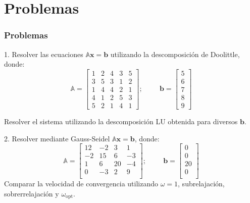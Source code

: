 \documentclass[9pt, aspectratio=169]{beamer}
\begin{document}
\section{Problemas}
\begin{frame}
 \frametitle{Problemas}
1. Resolver las ecuaciones $\mathbb{A} \mathbf{x}= \mathbf{b}$ utilizando la descomposición de Doolittle, donde:
\begin{equation*}
 \mathbb{A} = \left[ 
 \begin{array}{ccccc}
 1 & 2 & 4 & 3 & 5 \\
 3 & 5 & 3 & 1 & 2 \\
 1 & 4 & 4 & 2 & 1 \\
 4 & 1 & 2 & 5 & 3 \\
 5 & 2 & 1 & 4 & 1
  \end{array} \right]; \hspace{1cm}
\mathbf{b} = \left[ 
 \begin{array}{c}
 5 \\
 6 \\
 7 \\
 8 \\
 9
  \end{array} \right]
\end{equation*}

Resolver el sistema utilizando la descomposición LU obtenida para diversos $\mathbf{b}$.
\bigskip

2. Resolver mediante Gauss-Seidel $\mathbb{A} \mathbf{x}= \mathbf{b}$, donde:
\begin{equation*}
 \mathbb{A} = \left[ 
 \begin{array}{rrrr}
 12 & -2 & 3 & 1 \\
 -2 & 15 & 6 & -3 \\
 1 & 6 & 20 & -4 \\
 0 & -3 & 2 & 9 \\
  \end{array} \right]; \hspace{1cm}
\mathbf{b} = \left[ 
 \begin{array}{r}
 0  \\
 0 \\
 20 \\
 0 \\
  \end{array} \right]
\end{equation*}
Comparar la velocidad de convergencia utilizando $\omega = 1$, subrelajación, sobrerrelajación y $\omega_{\text{opt}}$.
\end{frame}
\end{document}
